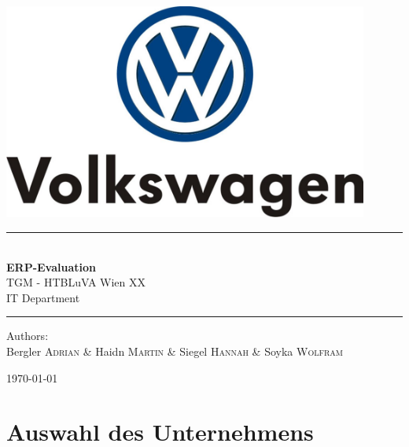 \documentclass[12pt]{article}
\begin{document}
\begin{titlepage}
\begin{center}
\includegraphics[width=0.9\textwidth]{images/vwlogo}\\[1cm]    


\rule{1.0\textwidth}{1mm}
{ \huge \bfseries \\[0.4cm]  \huge ERP-Evaluation \\[0.4cm] }
\LARGE TGM - HTBLuVA Wien XX \\ IT Department  \\[0.4cm]

\rule{1.0\textwidth}{1mm}




\noindent 
\vspace{3cm}

\begin{center}
\large
Authors: \\ 
Bergler \textsc{Adrian} \&
Haidn \textsc{Martin} \&
Siegel \textsc{Hannah} \&
Soyka \textsc{Wolfram}
\end{center}

\vfill

{\large \today}

\end{center}
\end{titlepage}

\tableofcontents


\ohead{\headmark}

\newpage

\section{Auswahl des Unternehmens}
\end{document}
